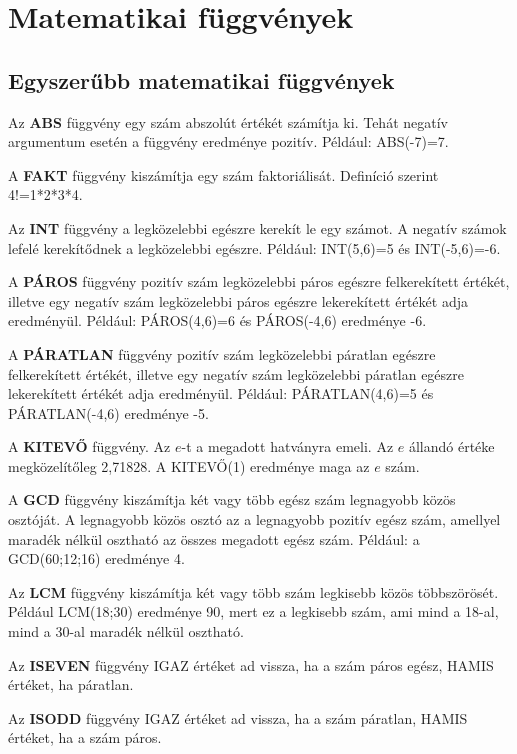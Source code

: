 \chapter{Matematikai függvények}
\thispagestyle{empty}

\section{Egyszerűbb matematikai függvények}

Az \textbf{ABS} függvény egy szám abszolút értékét
számítja ki. Tehát negatív argumentum esetén a függvény
eredménye pozitív. Például: ABS(-7)=7.

A \textbf{FAKT} függvény kiszámítja egy szám
faktoriálisát. Definíció szerint 4!=1*2*3*4.

Az \textbf{INT} függvény a legközelebbi egészre kerekít le egy
számot. A negatív számok lefelé kerekítődnek a
legközelebbi egészre. Például: INT(5,6)=5 és  INT(-5,6)=-6.

A \textbf{PÁROS} függvény pozitív szám legközelebbi páros
egészre felkerekített értékét, illetve egy negatív szám
legközelebbi páros egészre lekerekített értékét adja
eredményül. Például: PÁROS(4,6)=6 és  PÁROS(-4,6) eredménye
-6.

A \textbf{PÁRATLAN} függvény pozitív szám legközelebbi páratlan 
egészre felkerekített értékét, illetve egy negatív szám 
legközelebbi páratlan egészre lekerekített értékét adja 
eredményül. Például: PÁRATLAN(4,6)=5 és PÁRATLAN(-4,6) eredménye -5.

A \textbf{KITEVŐ} függvény. Az $e$-t a megadott hatványra emeli. Az $e$
állandó értéke megközelítőleg 2,71828. A KITEVŐ(1)
eredménye maga az $e$ szám.

A \textbf{GCD} függvény kiszámítja két vagy több egész
szám legnagyobb közös osztóját. A legnagyobb közös
osztó az a legnagyobb pozitív egész szám, amellyel maradék
nélkül osztható az összes megadott egész szám. Például:
a GCD(60;12;16) eredménye 4.

Az \textbf{LCM} függvény kiszámítja két vagy több szám
legkisebb közös többszörösét. Például LCM(18;30)
eredménye 90, mert ez a legkisebb szám, ami mind a 18-al, mind a
30-al maradék nélkül osztható.

Az \textbf{ISEVEN} függvény IGAZ értéket ad vissza, ha a szám
páros egész, HAMIS értéket, ha páratlan.

Az \textbf{ISODD} függvény IGAZ értéket ad vissza, ha a szám
páratlan, HAMIS értéket, ha a szám páros.

